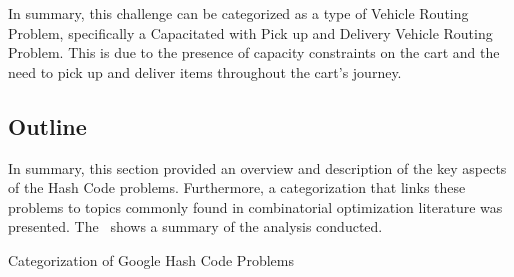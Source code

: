 In summary, this challenge can be categorized as a type of Vehicle Routing
Problem, specifically a Capacitated with Pick up and Delivery Vehicle Routing
Problem. This is due to the presence of capacity constraints on the cart and the
need to pick up and deliver items throughout the cart's journey.

\subsection{Outline}
\label{subsec:hashcode-outline}

In summary, this section provided an overview and description of the key aspects
of the Hash Code problems. Furthermore, a categorization that links these
problems to topics commonly found in combinatorial optimization literature was
presented. The~ shows a summary of the
analysis conducted.

\begin{table}[ht]
  
  \caption{Categorization of Google Hash Code Problems}
  \label{tab:hashcode-summary}
\end{table}